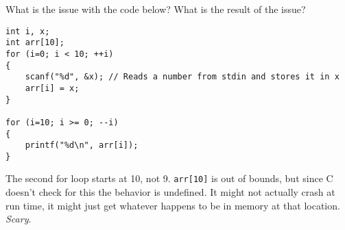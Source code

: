 What is the issue with the code below? What is the result of the issue?

\begin{lstlisting}
int i, x;
int arr[10];
for (i=0; i < 10; ++i)
{
	scanf("%d", &x); // Reads a number from stdin and stores it in x
	arr[i] = x;
}

for (i=10; i >= 0; --i)
{
	printf("%d\n", arr[i]);
}
\end{lstlisting}
\begin{answer}
The second for loop starts at 10, not 9.
\texttt{arr[10]} is out of bounds, but since C doesn't check for this the behavior is undefined.
It might not actually crash at run time, it might just get whatever happens to be in memory at that location.
\emph{Scary}.
\end{answer}
